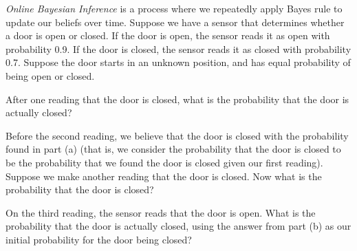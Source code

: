 \documentclass[12pt]{exam}
\begin{document}
\textit{Online Bayesian Inference} is a process where we repeatedly apply Bayes
rule to update our beliefs over time. Suppose we have a sensor that determines
whether a door is open or closed. 
If the door is open, the sensor reads it as open with probability 0.9. 
If the door is closed, the sensor reads it as closed with probability 0.7. Suppose the door starts in an unknown position, and has equal probability of being open or closed.

\begin{qparts}
    \item After one reading that the door is closed, what is the probability that the  door is actually closed?
    \item Before the second reading, we believe that the door is closed with the 
    probability found in part (a) (that is, we consider the probability that the door
    is closed to be the probability that we found the door is closed given our first reading). 
    Suppose we make another reading that the door  is closed. Now what is 
    the probability that the door is closed?
    \item On the third reading, the sensor reads that the door is open. What is 
    the probability that the door is actually closed, using the answer from part (b)
    as our initial probability for the door being closed?
\end{qparts}
\end{document}
